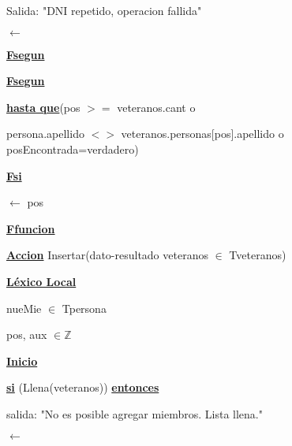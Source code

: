\documentclass{article}
\begin{document}
                                    \hspace{36mm} Salida: "DNI repetido, operacion fallida"

                                    \hspace{36mm} $\leftarrow$ 

                            \hspace{28mm}\underline{\textbf{Fsegun}}

                    \hspace{20mm}\underline{\textbf{Fsegun}}

                \hspace{16mm}\underline{\textbf{hasta que}}(pos $>=$ veteranos.cant o
                    
                    \hspace{24mm}persona.apellido $<>$ veteranos.personas[pos].apellido o posEncontrada=verdadero)

            \hspace{12mm}\underline{\textbf{Fsi}}

            \hspace{12mm}$\leftarrow$ pos

    \hspace{4mm}\underline{\textbf{Ffuncion}}

    \vspace{4mm}

    \hspace{4mm}\underline{\textbf{Accion}} Insertar(dato-resultado veteranos $\in$ Tveteranos)

        \hspace{8mm}\underline{\textbf{Léxico Local}}

            \hspace{12mm}nueMie $\in$ Tpersona

            \hspace{12mm}pos, aux $\in \mathbb{Z}$

        \hspace{8mm}\underline{\textbf{Inicio}}

            \hspace{12mm}\underline{\textbf{si}} (Llena(veteranos)) \underline{\textbf{entonces}}

                \hspace{16mm}salida: "No es posible agregar miembros. Lista llena."

                \hspace{16mm}$\leftarrow$
\end{document}
